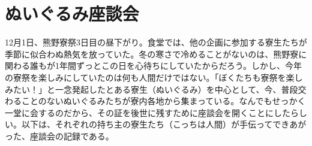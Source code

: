 \documentclass[9pt,4aj]{jsarticle}
\begin{document}
\newcommand{\talkernui}[1]{\noindent{\gtfamily \bfseries#1}:}

\section{ぬいぐるみ座談会}
12月1日、熊野寮祭3日目の昼下がり。食堂では、他の企画に参加する寮生たちが季節に似合わぬ熱気を放っていた。冬の寒さで冷めることがないのは、熊野寮に関わる誰もが1年間ずっとこの日を心待ちにしていたからだろう。しかし、今年の寮祭を楽しみにしていたのは何も人間だけではない。「ぼくたちも寮祭を楽しみたい！」と一念発起したとある寮生（ぬいぐるみ）を中心として、今、普段交わることのないぬいぐるみたちが寮内各地から集まっている。なんでもせっかく一堂に会するのだから、その証を後世に残すために座談会を開くことにしたらしい。以下は、それぞれの持ち主の寮生たち（こっちは人間）が手伝ってできあがった、座談会の記録である。

\end{document}
